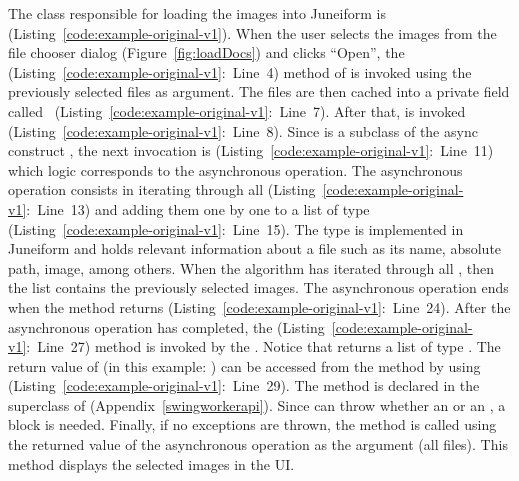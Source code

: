 \documentclass[type=bsc,accentcolor=tud9c]{tudthesis}
\begin{document}
The class responsible for loading the images into Juneiform is  (Listing~\ref{code:example-original-v1}). When the user selects the images from the file chooser dialog (Figure~\ref{fig:loadDocs}) and clicks ``Open'', the  (Listing~\ref{code:example-original-v1}:~Line~4) method of  is invoked using the previously selected files as argument. The files are then cached into a private field called ~(Listing~\ref{code:example-original-v1}:~Line~7). After that,  is invoked (Listing~\ref{code:example-original-v1}:~Line~8). Since  is a subclass of the async construct , the next invocation is  (Listing~\ref{code:example-original-v1}:~Line~11) which logic corresponds to the asynchronous operation. The asynchronous operation consists in iterating through all  (Listing~\ref{code:example-original-v1}:~Line~13) and adding them one by one to a list  of type  (Listing~\ref{code:example-original-v1}:~Line~15). The type  is implemented in Juneiform and holds relevant information about a file such as its name, absolute path, image, among others. When the algorithm has iterated through all , then the list  contains the previously selected images. The asynchronous operation ends when the method  returns (Listing~\ref{code:example-original-v1}:~Line~24). After the asynchronous operation has completed, the  (Listing~\ref{code:example-original-v1}:~Line~27) method is invoked by the . Notice that  returns a list of type . The return value of  (in this example: ) can be accessed from the method  by using  (Listing~\ref{code:example-original-v1}:~Line~29). The method  is declared in the superclass of  (Appendix~\ref{swingworkerapi}). Since  can throw whether an  or an , a  block is needed. Finally, if no exceptions are thrown, the  method is called using the returned value of the asynchronous operation as the argument (all files). This method displays the selected images in the UI.
\end{document}
